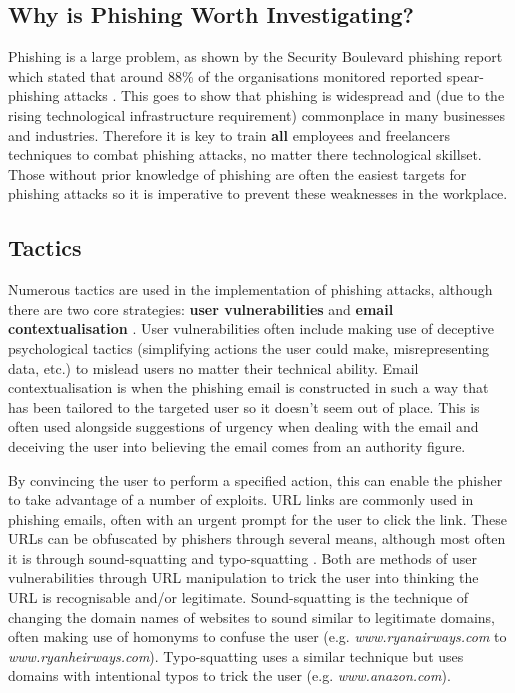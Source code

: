 \documentclass{l4proj}
\begin{document}
\subsection{Why is Phishing Worth Investigating?}
Phishing is a large problem, as shown by the Security Boulevard phishing report which stated that around 88\% of the organisations monitored reported spear-phishing attacks \citep{bhardwaj2020phishing}. This goes to show that phishing is widespread and (due to the rising technological infrastructure requirement) commonplace in many businesses and industries. Therefore it is key to train \textbf{all} employees and freelancers techniques to combat phishing attacks, no matter there technological skillset. Those without prior knowledge of phishing are often the easiest targets for phishing attacks so it is imperative to prevent these weaknesses in the workplace.

\subsection{Tactics}
\label{sec:other_tactics}
Numerous tactics are used in the implementation of phishing attacks, although there are two core strategies: \textbf{user vulnerabilities} and \textbf{email contextualisation} \citep{nicho2018evaluating}. User vulnerabilities often include making use of deceptive psychological tactics (simplifying actions the user could make, misrepresenting data, etc.) to mislead users no matter their technical ability. Email contextualisation is when the phishing email is constructed in such a way that has been tailored to the targeted user so it doesn't seem out of place. This is often used alongside suggestions of urgency when dealing with the email and deceiving the user into believing the email comes from an authority figure.

By convincing the user to perform a specified action, this can enable the phisher to take advantage of a number of exploits. URL links are commonly used in phishing emails, often with an urgent prompt for the user to click the link. These URLs can be obfuscated by phishers through several means, although most often it is through sound-squatting and typo-squatting \citep{chiew2018survey}. Both are methods of user vulnerabilities through URL manipulation to trick the user into thinking the URL is recognisable and/or legitimate. Sound-squatting is the technique of changing the domain names of websites to sound similar to legitimate domains, often making use of homonyms to confuse the user (e.g. \textit{www.ryanairways.com} to \textit{www.ryanheirways.com}). Typo-squatting uses a similar technique but uses domains with intentional typos to trick the user (e.g. \textit{www.anazon.com}).
\end{document}
